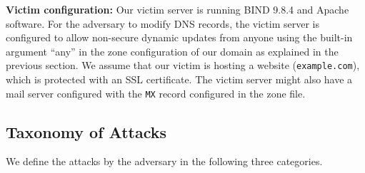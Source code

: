 
\textbf{Victim configuration:} Our victim server is running BIND 9.8.4 and Apache software. 
For the adversary to modify DNS records, the victim server is configured to allow non-secure dynamic updates %
from anyone using the built-in argument ``any'' in the zone configuration of our domain as explained in the previous section.
%
We assume that our victim is hosting a website (\texttt{example.com}), 
which is protected with an SSL certificate. 
The victim server might also have a mail server configured with the \texttt{MX} record configured in the zone file.  


\subsection{Taxonomy of Attacks}
We define the attacks by the adversary in the following three categories. 

